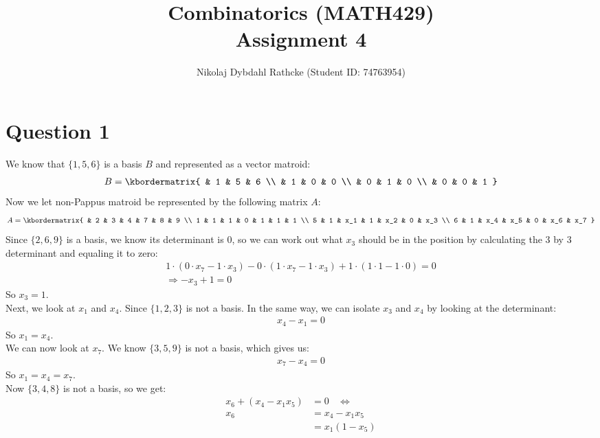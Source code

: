 \documentclass[a4paper, fleqn]{article}
\author{Nikolaj Dybdahl Rathcke (Student ID: 74763954)}
\title{Combinatorics (MATH429) \\ Assignment 4}
\begin{document}
\maketitle

\section*{Question 1}
We know that $\{1,5,6\}$ is a basis $B$ and represented as a vector matroid:
\begin{align*}
  B =
  \kbordermatrix{
    & 1 & 5 & 6 \\
    & 1 & 0 & 0 \\
    & 0 & 1 & 0 \\
    & 0 & 0 & 1
  }
\end{align*}
Now we let non-Pappus matroid be represented by the following matrix $A$:
\begin{align*}
  A=\kbordermatrix{
    & 2 & 3 & 4 & 7 & 8 & 9 \\
    1 & 1 & 1 & 0 & 1 & 1 & 1 \\
    5 & 1 & x_1 & 1 & x_2 & 0 & x_3 \\
    6 & 1 & x_4 & x_5 & 0 & x_6 & x_7
  }
\end{align*}
Since $\{2,6,9\}$ is a basis, we know its determinant is $0$, so we can work out what
$x_3$ should be in the position by calculating the $3$ by $3$ determinant and equaling it to zero:
\begin{align*}
  1\cdot(0\cdot x_7-1\cdot x_3)-0\cdot(1\cdot x_7-1\cdot x_3)+1\cdot(1\cdot 1-1\cdot 0)=0
  \\
  \Rightarrow -x_3+1=0
\end{align*}
So $x_3=1$. \\
Next, we look at $x_1$ and $x_4$. Since $\{1,2,3\}$ is not a basis. In
the same way, we can isolate $x_3$ and $x_4$ by looking at the determinant:
\begin{align*}
  x_4-x_1=0
\end{align*}
So $x_1=x_4$. \\
We can now look at $x_7$. We know $\{3,5,9\}$ is not a basis, which gives us:
\begin{align*}
  x_7-x_4=0
\end{align*}
So $x_1=x_4=x_7$. \\
Now $\{3,4,8\}$ is not a basis, so we get:
\begin{align*}
  x_6+(x_4-x_1x_5)&=0 \ \ \ \ \Leftrightarrow \\
  x_6&=x_4-x_1x_5 \\
     &=x_1(1-x_5)
\end{align*}
\end{document}
